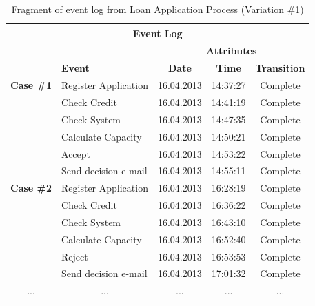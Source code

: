 \begin{table}[h]
\centering
\caption{Fragment of event log from Loan Application Process (Variation \#1)\cite{loan-app-data}}
\label{table:event-log-loan}
\begin{tabular}{@{}llccc@{}}
\toprule
\multicolumn{5}{c}{\textbf{Event Log}}                                                                  \\ \midrule
                        &                         & \multicolumn{3}{c}{\textbf{Attributes}}             \\ \midrule
                        & \textbf{Event}          & \textbf{Date} & \textbf{Time} & \textbf{Transition} \\ \midrule
\textbf{Case \#1}       & Register Application    & 16.04.2013    & 14:37:27      & Complete            \\ \midrule
                        & Check Credit            & 16.04.2013    & 14:41:19      & Complete            \\ \midrule
                        & Check System            & 16.04.2013    & 14:47:35      & Complete            \\ \midrule
                        & Calculate Capacity      & 16.04.2013    & 14:50:21      & Complete            \\ \midrule
                        & Accept                  & 16.04.2013    & 14:53:22      & Complete            \\ \midrule
                        & Send decision e-mail    & 16.04.2013    & 14:55:11      & Complete            \\ \midrule
\textbf{Case \#2}       & Register Application    & 16.04.2013    & 16:28:19      & Complete            \\ \midrule
                        & Check Credit            & 16.04.2013    & 16:36:22      & Complete            \\ \midrule
                        & Check System            & 16.04.2013    & 16:43:10      & Complete            \\ \midrule
                        & Calculate Capacity      & 16.04.2013    & 16:52:40      & Complete            \\ \midrule
                        & Reject                  & 16.04.2013    & 16:53:53      & Complete            \\ \midrule
                        & Send decision e-mail    & 16.04.2013    & 17:01:32      & Complete            \\ \midrule
\multicolumn{1}{c}{...} & \multicolumn{1}{c}{...} & ...           & ...           & ...                 \\ \bottomrule
\end{tabular}
\end{table}

